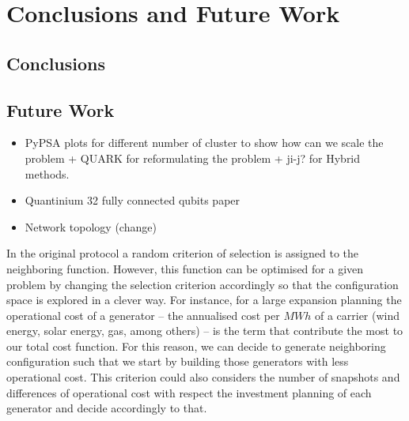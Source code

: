 
\chapter{Conclusions and Future Work} %

\label{Chapter5} %




\section{Conclusions}

\section{Future Work}
\begin{itemize}
    \item PyPSA plots for different number of cluster to show how can we scale the problem + QUARK for reformulating the problem + ji-j? for Hybrid methods.
    \item Quantinium 32 fully connected qubits paper
    \item Network topology (change)
\end{itemize}

In the original protocol a random criterion of selection is assigned to the neighboring function. However, this function can be optimised for a given problem by changing the selection criterion accordingly so that the configuration space is explored in a clever way. For instance, for a large expansion planning the operational cost of a generator -- the annualised cost per $MWh$ of a carrier (wind energy, solar energy, gas, among others) --  is the term that contribute the most to our total cost function. For this reason, we can decide to generate neighboring configuration such that we start by building those generators with less operational cost. This criterion could also considers the number of snapshots and differences of operational cost with respect the investment planning of each generator and decide accordingly to that.


